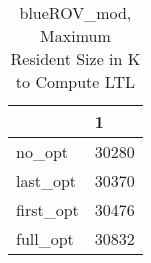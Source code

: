 \begin{table}
\caption{blueROV\_mod, Maximum Resident Size in K to Compute LTL}
\label{blueROV_mod_LTL_size}
\begin{tabular}{ll}
\toprule
 & 1 \\
\midrule
no\_opt & 30280 \\
last\_opt & 30370 \\
first\_opt & 30476 \\
full\_opt & 30832 \\
\bottomrule
\end{tabular}
\end{table}

